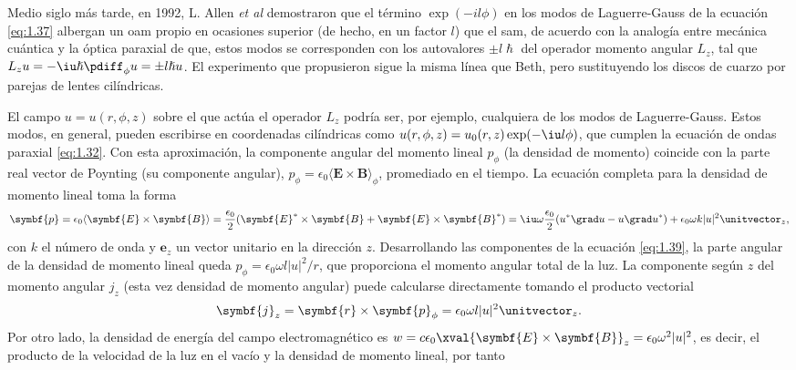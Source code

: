 Medio siglo más tarde, en 1992, L. Allen \emph{et al} demostraron \autocite{Allen1992} que el término $\exp(-il \phi)$ en los modos de Laguerre-Gauss de la ecuación \eqref{eq:1.37} albergan un \acrshort{oam} propio en ocasiones superior (de hecho, en un factor $l$) que el \acrshort{sam}, de acuerdo con la analogía entre mecánica cuántica y la óptica paraxial \autocite{Born2019} de que, estos modos se corresponden con los autovalores $\pm l \hslash $ del operador momento angular $L_{z}$, tal que $L_{z}u= -\iu \hslash \pdiff_{\phi}u=\pm l \hslash u$. El experimento que propusieron sigue la misma línea que Beth, pero sustituyendo los discos de cuarzo por parejas de lentes cilíndricas.

El campo $u=u(r,\phi,z)$ sobre el que actúa el operador $L_{z}$ podría ser, por ejemplo, cualquiera de los modos de Laguerre-Gauss. Estos modos, en general, pueden escribirse en coordenadas cilíndricas como $u(r,\phi,z) = u_{0}(r,z)\exp(-\iu l \phi)$, que cumplen la ecuación de ondas paraxial \eqref{eq:1.32}. Con esta aproximación, la componente angular del momento lineal $p_{\phi}$ (la densidad de momento) coincide con la parte real vector de Poynting (su componente angular), $p_{\phi} = \epsilon_{0}\langle\symbf{E}\times \symbf{B}\rangle_{\phi}$, promediado en el tiempo. La ecuación completa para la densidad de momento lineal toma la forma
\begin{equation}\label{eq:1.39}
  \symbf{p} = \epsilon_{0}\langle\symbf{E}\times \symbf{B}\rangle = \frac{\epsilon_{0}}{2}(\symbf{E}^{*}\times \symbf{B} + \symbf{E}\times \symbf{B}^{*}) = \iu \omega \frac{\epsilon_{0}}{2} (u^{*}\grad u - u \grad u^{*}) + \epsilon_{0} \omega k |u|^{2}\unitvector_{z},
\end{equation}
con $k$ el número de onda y $\symbf{e}_{z}$ un vector unitario en la dirección $z$. Desarrollando las componentes de la ecuación \eqref{eq:1.39}, la parte angular de la densidad de momento lineal queda $p_{\phi}=\epsilon_{0} \omega l |u|^{2}/r$, que proporciona el momento angular total de la luz. La componente según $z$ del momento angular $j_{z}$ (esta vez densidad de momento angular) puede calcularse directamente tomando el producto vectorial
\begin{equation}\label{eq:1.40}
  \symbf{j}_{z} = \symbf{r}\times \symbf{p}_{\phi} = \epsilon_{0} \omega l |u|^{2}\unitvector_{z}.
\end{equation}
Por otro lado, la densidad de energía del campo electromagnético es $w = c \epsilon_{0}\xval{\symbf{E}\times \symbf{B}}_{z} = \epsilon_{0} \omega^{2} |u|^{2}$, es decir, el producto de la velocidad de la luz en el vacío y la densidad de momento lineal, por tanto
